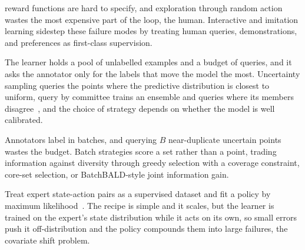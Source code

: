  reward functions are hard to specify,
and exploration through random action wastes the most expensive part of the loop, the human.
Interactive and imitation learning sidestep these failure modes
by treating human queries, demonstrations, and preferences as first-class supervision.


The learner holds a pool of unlabelled examples and a budget of queries,
and it asks the annotator only for the labels that move the model the most.
Uncertainty sampling queries the points where the predictive distribution is closest to uniform,
query by committee trains an ensemble and queries where its members disagree~\cite{Settles2012ActiveLearning},
and the choice of strategy depends on whether the model is well calibrated.

Annotators label in batches, and querying $B$ near-duplicate uncertain points wastes the budget.
Batch strategies score a set rather than a point, trading information against diversity
through greedy selection with a coverage constraint, core-set selection,
or BatchBALD-style joint information gain.


Treat expert state-action pairs as a supervised dataset and fit a policy by maximum likelihood~\cite{Pomerleau1991ALVINN}.
The recipe is simple and it scales, but the learner is trained on the expert's state distribution
while it acts on its own, so small errors push it off-distribution and the policy compounds them
into large failures, the covariate shift problem.

